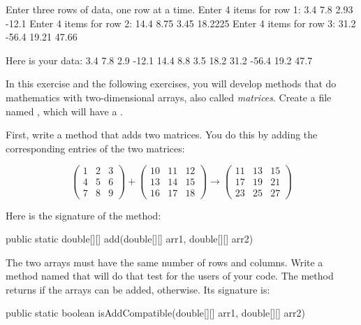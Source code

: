 \begin{exercise}
\begin{stdout}
Enter three rows of data, one row at a time.
Enter 4 items for row 1: 3.4 7.8 2.93 -12.1
Enter 4 items for row 2: 14.4 8.75 3.45 18.2225
Enter 4 items for row 3: 31.2 -56.4 19.21 47.66

Here is your data:
    3.4     7.8     2.9   -12.1 
   14.4     8.8     3.5    18.2 
   31.2   -56.4    19.2    47.7 
\end{stdout}

\end{exercise}

\begin{exercise}
In this exercise and the following exercises, you will develop methods that do mathematics with two-dimensional arrays, also called {\em matrices}.  Create a file named , which will have a .

First, write a method that adds two matrices. You do this by adding the corresponding entries of the two matrices:

\begin{equation*}
\begin{pmatrix}
1 & 2 & 3 \\
4 & 5 & 6 \\
7 & 8 & 9
\end{pmatrix}
+
\begin{pmatrix}
10 & 11 & 12 \\
13 & 14 & 15 \\
16 & 17 & 18
\end{pmatrix}
\rightarrow
\begin{pmatrix}
11 & 13 & 15 \\
17 & 19 & 21 \\
23 & 25 & 27
\end{pmatrix}
\end{equation*}

Here is the signature of the method:

\begin{code}
public static double[][] add(double[][] arr1, double[][] arr2)
\end{code}

The two arrays must have the same number of rows and columns. Write a method named  that will do that test for the users of your code. The method returns  if the arrays can be added,  otherwise. Its signature is:

\begin{code}
public static boolean isAddCompatible(double[][] arr1, double[][] arr2)
\end{code}


\end{exercise}
